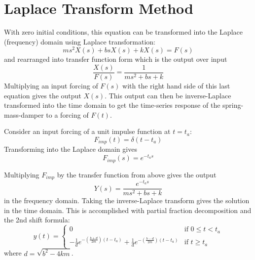 \documentclass[10pt,letterpaper]{article}
\begin{document}
\section{Laplace Transform Method}
With zero initial conditions, this equation can be transformed into the Laplace (frequency) domain using Laplace transformation:
\begin{equation}
	ms^2 X(s) + bsX(s) + kX(s) = F(s)
\end{equation}
and rearranged into transfer function form which is the output over input
\begin{equation}
	\frac{X(s)}{F(s)} = \frac{1}{ms^2 + bs + k}
\end{equation}
Multiplying an input forcing of $F(s)$ with the right hand side of this last equation gives the output $X(s)$.
This output can then be inverse-Laplace transformed into the time domain to get the time-series response of the spring-mass-damper to a forcing of $F(t)$.

Consider an input forcing of a unit impulse function at $t=t_a$:
\begin{equation}
	F_{imp}(t) = \delta(t-t_a)
\end{equation}
Transforming into the Laplace domain gives
\begin{equation}
	F_{imp}(s) = e^{-t_a s}
\end{equation}

Multiplying $F_{imp}$ by the transfer function from above gives the output
\begin{equation}
	Y(s) = \frac{e^{-t_a s}}{ms^2 + bs + k}
\end{equation}
in the frequency domain.
Taking the inverse-Laplace transform gives the solution in the time domain.
This is accomplished with partial fraction decomposition and the 2nd shift formula:
\begin{equation}
	y(t) =
	\begin{cases}
		0 & \text{if } 0 \leq t < t_a \\
		-\frac{1}{d}e^{-(\frac{b+d}{2m})(t-t_a)} + \frac{1}{d}e^{-(\frac{b-d}{2m})(t-t_a)} & \text{if } t\geq t_a
	\end{cases}
\end{equation}
where $d=\sqrt{b^2 - 4km}$.
\end{document}
